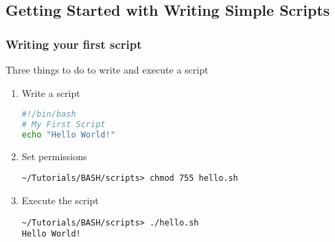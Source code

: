 \documentclass[slidestop,mathserif,compress,xcolor=svgnames]{beamer}
\newenvironment{bblock}[0]
{
\begin{beamerboxesrounded}[upper=uppercol1,lower=lowercol1,shadow=true]}
{\end{beamerboxesrounded}}
\begin{document}
\subsection{Getting Started with Writing Simple Scripts}
\begin{frame}[fragile]
  \frametitle{\small Writing your first script}
  \begin{bblock}{Three things to do to write and execute a script}
    {\scriptsize
    \begin{enumerate}
      \item Write a script
      {\tiny
      \begin{lstlisting}[language=bash]
#!/bin/bash
# My First Script
echo "Hello World!"
      \end{lstlisting}
      }
      \item Set permissions
      {\tiny
      \begin{lstlisting}[style=LINUX]
~/Tutorials/BASH/scripts> chmod 755 hello.sh 
      \end{lstlisting}
      }
      \item Execute the script
      {\tiny
      \begin{lstlisting}[style=LINUX]
~/Tutorials/BASH/scripts> ./hello.sh 
Hello World!
      \end{lstlisting}
      }
    \end{enumerate}
    }
  \end{bblock}
\end{frame}
\end{document}
